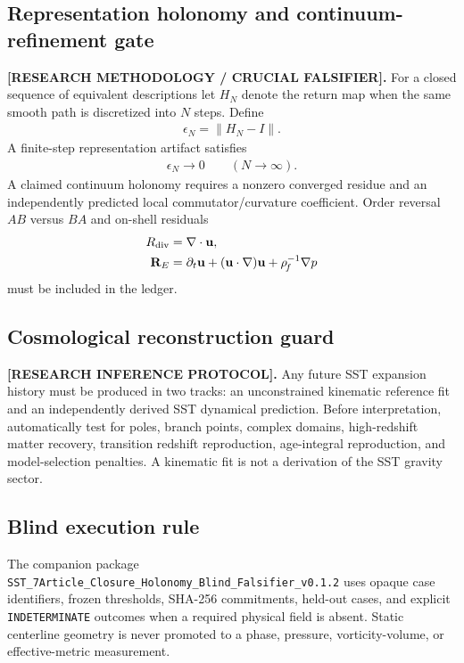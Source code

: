 \subsection{Representation holonomy and continuum-refinement gate}
\textbf{[RESEARCH METHODOLOGY / CRUCIAL FALSIFIER].}
For a closed sequence of equivalent descriptions let \(H_N\) denote the
return map when the same smooth path is discretized into \(N\) steps.  Define
\begin{align}
\epsilon_N=\|H_N-I\|.
\end{align}
A finite-step representation artifact satisfies
\begin{align}
\epsilon_N\rightarrow0
\qquad (N\rightarrow\infty).
\end{align}
A claimed continuum holonomy requires a nonzero converged residue and an
independently predicted local commutator/curvature coefficient.  Order reversal
\(AB\) versus \(BA\) and on-shell residuals
\begin{align}
R_{\rm div}&=\nabla\cdot\mathbf u,\\
\mathbf R_E&=\partial_t\mathbf u+(\mathbf u\cdot\nabla)\mathbf u
+\rho_{\!f}^{-1}\nabla p
\end{align}
must be included in the ledger.

\subsection{Cosmological reconstruction guard}
\textbf{[RESEARCH INFERENCE PROTOCOL].}
Any future SST expansion history must be produced in two tracks: an
unconstrained kinematic reference fit and an independently derived SST
dynamical prediction.  Before interpretation, automatically test for poles,
branch points, complex domains, high-redshift matter recovery, transition
redshift reproduction, age-integral reproduction, and model-selection
penalties.  A kinematic fit is not a derivation of the SST gravity sector.

\subsection{Blind execution rule}
The companion package
\texttt{SST\_7Article\_Closure\_Holonomy\_Blind\_Falsifier\_v0.1.2}
uses opaque case identifiers, frozen thresholds, SHA-256 commitments, held-out
cases, and explicit \texttt{INDETERMINATE} outcomes when a required physical
field is absent.  Static centerline geometry is never promoted to a phase,
pressure, vorticity-volume, or effective-metric measurement.
